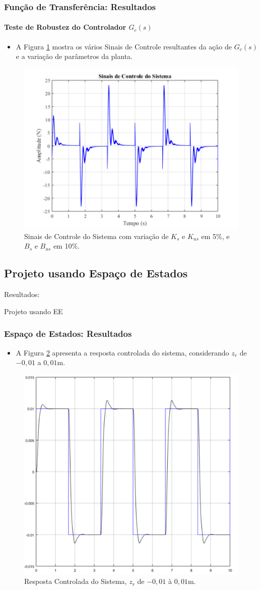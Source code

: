 \documentclass{beamer}
\begin{document}
\begin{frame}
\frametitle{Função de Transferência: Resultados}
\framesubtitle{Teste de Robustez do Controlador $G_c(s)$}
\begin{itemize}
\item A Figura \ref{sinalcontroleIntervalar2} mostra os vários Sinais de Controle resultantes da ação de $G_c(s)$ e a variação de parâmetros da planta.
\end{itemize}
\begin{figure}[H]
  \centering
\includegraphics[width=.5\columnwidth]{./imagens/sinal_de_controle_variando_Ks_Kus_5_Bs_Bus_10_controlador_sem_robustez.pdf}
    \renewcommand{\figurename}{Fig. 14}
    \caption{Sinais de Controle do Sistema com variação de $K_s$ e $K_{us}$ em 5\%, e $B_s$ e $B_{us}$ em 10\%.}
  \label{sinalcontroleIntervalar2}
\end{figure}
\end{frame}

\subsection{Projeto usando Espaço de Estados}
\begin{frame}
\Huge{\centerline{Resultados:}}
\Huge{\centerline{Projeto usando EE}}
\end{frame}

\begin{frame}
\frametitle{Espaço de Estados: Resultados}
\begin{itemize}
\item A Figura \ref{malhafechadaEE} apresenta a resposta controlada do sistema, considerando $z_r$ de $-0,01$ a $0,01$m.
\end{itemize}
\begin{figure}[H]
	\centering
\includegraphics[width=.45\columnwidth]{./imagens/resposta_controlada_sistema.pdf}
    \renewcommand{\figurename}{Fig. 15}
    \caption{Resposta Controlada do Sistema, $z_r$ de $-0,01$ à $0,01$m.}
	\label{malhafechadaEE}
\end{figure}
\end{frame}
\end{document}

